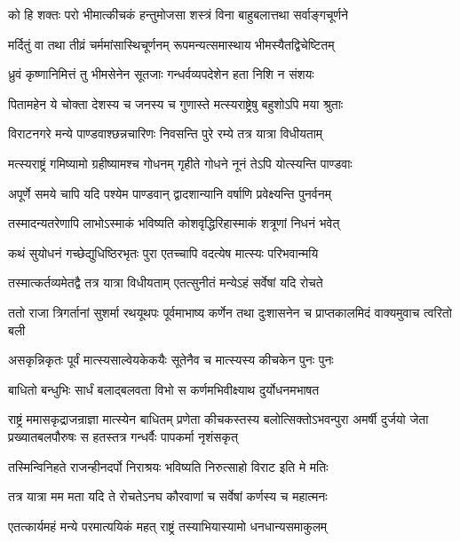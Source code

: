 \twolineshloka
{को हि शक्तः परो भीमात्कीचकं हन्तुमोजसा}
{शस्त्रं विना बाहुबलात्तथा सर्वाङ्गचूर्णने}


\twolineshloka
{मर्दितुं वा तथा तीव्रं चर्ममांसास्थिचूर्णनम्}
{रूपमन्यत्समास्थाय भीमस्यैतद्विचेष्टितम्}


\twolineshloka
{ध्रुवं कृष्णानिमित्तं तु भीमसेनेन सूतजाः}
{गन्धर्वव्यपदेशेन हता निशि न संशयः}


\twolineshloka
{पितामहेन ये चोक्ता देशस्य च जनस्य च}
{गुणास्ते मत्स्यराष्ट्रेषु बहुशोऽपि मया श्रुताः}


\twolineshloka
{विराटनगरे मन्ये पाण्डवाश्छन्नचारिणः}
{निवसन्ति पुरे रम्ये तत्र यात्रा विधीयताम्}


\twolineshloka
{मत्स्यराष्ट्रं गमिष्यामो ग्रहीष्यामश्च गोधनम्}
{गृहीते गोधने नूनं तेऽपि योत्स्यन्ति पाण्डवाः}


\twolineshloka
{अपूर्णे समये चापि यदि पश्येम पाण्डवान्}
{द्वादशान्यानि वर्षाणि प्रवेक्ष्यन्ति पुनर्वनम्}


\twolineshloka
{तस्मादन्यतरेणापि लाभोऽस्माकं भविष्यति}
{कोशवृद्धिरिहास्माकं शत्रूणां निधनं भवेत्}


\twolineshloka
{कथं सुयोधनं गच्छेद्युधिष्ठिरभृतः पुरा}
{एतच्चापि वदत्येष मात्स्यः परिभवान्मयि}


\twolineshloka
{तस्मात्कर्तव्यमेतद्वै तत्र यात्रा विधीयताम्}
{एतत्सुनीतं मन्येऽहं सर्वेषां यदि रोचते}



\threelineshloka
{ततो राजा त्रिगर्तानां सुशर्मा रथयूथपः}
{पूर्वमाभाष्य कर्णेन तथा दुःशासनेन च}
{प्राप्तकालमिदं वाक्यमुवाच त्वरितो बली}


\twolineshloka
{असकृन्निकृतः पूर्वं मात्स्यसाल्वेयकेकयैः}
{सूतेनैव च मात्स्यस्य कीचकेन पुनः पुनः}


\twolineshloka
{बाधितो बन्धुभिः सार्धं बलाद्बलवता विभो}
{स कर्णमभिवीक्ष्याथ दुर्योधनमभाषत}


\onelineshloka
{राष्ट्रं ममासकृद्राजन्राज्ञा मात्स्येन बाधितम्}
\threelineshloka
{प्रणेता कीचकस्तस्य बलोत्सिक्तोऽभवन्पुरा}
{अमर्षी दुर्जयो जेता प्रख्यातबलपौरुषः}
{स हतस्तत्र गन्धर्वैः पापकर्मा नृशंसकृत्}


\twolineshloka
{तस्मिन्विनिहते राजन्हीनदर्पो निराश्रयः}
{भविष्यति निरुत्साहो विराट इति मे मतिः}


\twolineshloka
{तत्र यात्रा मम मता यदि ते रोचतेऽनघ}
{कौरवाणां च सर्वेषां कर्णस्य च महात्मनः}


\twolineshloka
{एतत्कार्यमहं मन्ये परमात्ययिकं महत्}
{राष्ट्रं तस्याभियास्यामो धनधान्यसमाकुलम्}


